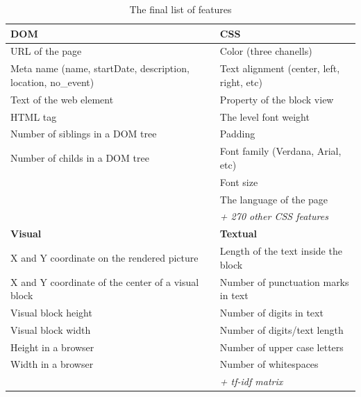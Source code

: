 \begin{table}[h]
\begin{center}
{\renewcommand{\arraystretch}{1.2}
\begin{tabular}{| p{6cm} | p{6cm} |}
\hline
\textbf{DOM}   &   \textbf{CSS}\\
\hline
URL of the page    &    Color (three chanells)\\
Meta name (name, startDate, description, location, no\_event)    &    Text alignment (center, left, right, etc)    \\
Text of the web element    &    Property of the block view    \\
HTML tag    &    The level font weight    \\
Number of siblings in a DOM tree    &    Padding    \\
Number of childs in a DOM tree    &    Font family (Verdana, Arial, etc)    \\
    &    Font size \\
    &    The language of the page \\
    
    &    \textit{+ 270 other CSS features} \\
\hline
\textbf{Visual}   &   \textbf{Textual}  \\
\hline
X and Y coordinate on the rendered picture    &    Length of the text inside the block    \\
X and Y coordinate of the center of a visual block    &    Number of punctuation marks in text    \\
Visual block height     &    Number of digits in text    \\
Visual block width        &    Number of digits/text length    \\
Height in a browser     &    Number of upper case letters    \\
Width in a browser     &    Number of whitespaces    \\

     &    \textit{+ tf-idf matrix}    \\
\hline
\end{tabular}}
\caption{The final list of features}
\label{table:featurelist}
\end{center}
\end{table}    

